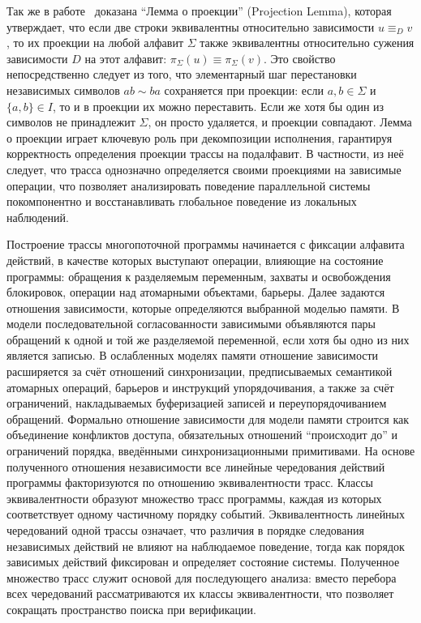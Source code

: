 Так же в работе~\cite{diekert1997partial} доказана ``Лемма о
проекции'' (Projection
Lemma), которая утверждает, что если две строки эквивалентны
относительно зависимости $u \equiv_D v$, то их проекции на
любой алфавит $\Sigma$ также эквивалентны относительно сужения зависимости
$D$ на этот алфавит: $\pi_\Sigma(u) \equiv \pi_\Sigma(v)$.
Это свойство непосредственно следует из того, что элементарный шаг
перестановки независимых символов $ab \sim ba$ сохраняется при проекции:
если $a,b \in \Sigma$ и $\{a, b\} \in I$, то и в проекции их можно
переставить. Если же хотя бы один из символов не принадлежит
$\Sigma$, он просто удаляется, и проекции совпадают.
Лемма о проекции играет ключевую роль при декомпозиции исполнения,
гарантируя корректность определения проекции трассы на подалфавит. В
частности, из неё следует, что трасса однозначно определяется своими
проекциями на зависимые операции, что позволяет анализировать
поведение параллельной системы покомпонентно и восстанавливать
глобальное поведение из локальных наблюдений.

Построение трассы многопоточной программы начинается с фиксации
алфавита действий, в качестве которых выступают операции, влияющие на
состояние программы: обращения к разделяемым переменным, захваты и
освобождения блокировок, операции над атомарными объектами, барьеры.
Далее задаются отношения зависимости, которые определяются выбранной
моделью памяти.
В модели последовательной согласованности зависимыми объявляются пары
обращений к одной и той же разделяемой переменной, если хотя бы одно
из них является записью.
В ослабленных моделях памяти отношение зависимости расширяется за
счёт отношений синхронизации, предписываемых семантикой атомарных
операций, барьеров и инструкций упорядочивания, а также за счёт
ограничений, накладываемых буферизацией записей и переупорядочиванием обращений.
Формально отношение зависимости для модели памяти строится как
объединение конфликтов доступа, обязательных отношений ``происходит
до'' и ограничений порядка, введёнными синхронизационными примитивами.
На основе полученного отношения независимости все линейные
чередования действий программы факторизуются по отношению
эквивалентности трасс.
Классы эквивалентности образуют множество трасс программы, каждая из
которых соответствует одному частичному порядку событий.
Эквивалентность линейных чередований одной трассы означает, что
различия в порядке следования независимых действий не влияют на
наблюдаемое поведение, тогда как порядок зависимых действий
фиксирован и определяет состояние системы.
Полученное множество трасс служит основой для последующего анализа:
вместо перебора всех чередований рассматриваются их классы
эквивалентности, что позволяет сокращать пространство поиска при верификации.

